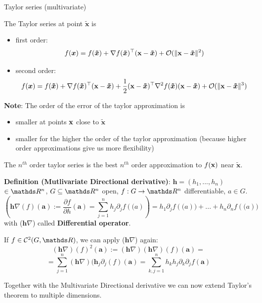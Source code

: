 \begin{vbframe}{Taylor series (multivariate)}

  The Taylor series at point $\bm{\tilde x}$ is
  
  \begin{itemize}
    \item first order: 
    $$
    f(\bm{x}) = f(\bm{\tilde{x}}) + \nabla f(\bm{\tilde{x}})^\top(\mathbf{x}-\bm{\tilde{x}}) + \mathcal{O}(\|\mathbf{x} - \bm{\tilde{x}}\|^2) 
    $$
    \item second order: 
    $$
    f(\bm{x}) = f(\bm{\tilde{x}}) + \nabla f(\bm{\tilde{x}})^\top(\mathbf{x}-\bm{\tilde{x}}) +
    \frac 12(\mathbf{x}-\bm{\tilde{x}})^\top\nabla^2 f(\bm{\tilde{x}})(\mathbf{x}-\bm{\tilde{x}}) + \mathcal{O}(\|\mathbf{x} - \bm{\tilde{x}}\|^3)
    $$
  \end{itemize}
  
  \textbf{Note}: The order of the error of the taylor approximation is 
  \begin{itemize}
    \item smaller at points $\mathbf{x}$ close to $\bm{\tilde x}$
    \item smaller for the higher the order of the taylor approximation (because higher order approximations give us more flexibility)
  \end{itemize}
  
  The $n^{th}$ order taylor series is the best $n^{th}$ order approximation to $f(\mathbf{x})$ near $\bm{\tilde{x}}$. 
  
  \framebreak

    \textbf{Definition (Mutlivariate Directional derivative)}: $\bm{h} = (h_{1}, ..., h_{n})$ $\in \R^{n}$, $G \subseteq \R^{n}$ open, $f : G \rightarrow \R^{n}$ differentiable, $a \in G$.
    $$(\bm{h}\nabla(f)(\bm{a}) := \frac{\partial f}{\partial h}(\bm{a}) = \sum_{j=1}^{n} h_{j}\partial_{j}f(\bm(a)) = h_{1}\partial_{j}f(\bm(a)) + ... + h_{n}\partial_{n}f(\bm(a))$$
    with ($\bm{h}\nabla$) called \textbf{Differential operator}.
    
    \vspace*{0.2cm}
    
    If $f \in \mathcal{C}^{2}(G,\R)$, we can apply ($\bm{h}\nabla$) again:
    $$(\bm{h}\nabla)(f)^{2}(\bm{a}) := (\bm{h}\nabla)(\bm{h}\nabla)(f)(\bm{a}) = $$
    $$ = \sum_{j=1}^{n}(\bm{h}\nabla)(\bm{h}_{j}\partial_{j}(f)(\bm{a}) = \sum_{k,j=1}^{n}h_{k}h_{j}\partial_{k}\partial_{j}f(\bm{a})$$

  \framebreak

    Together with the Multivariate Directional derivative we can now extend Taylor's theorem to multiple dimensions.
    

\end{vbframe}
